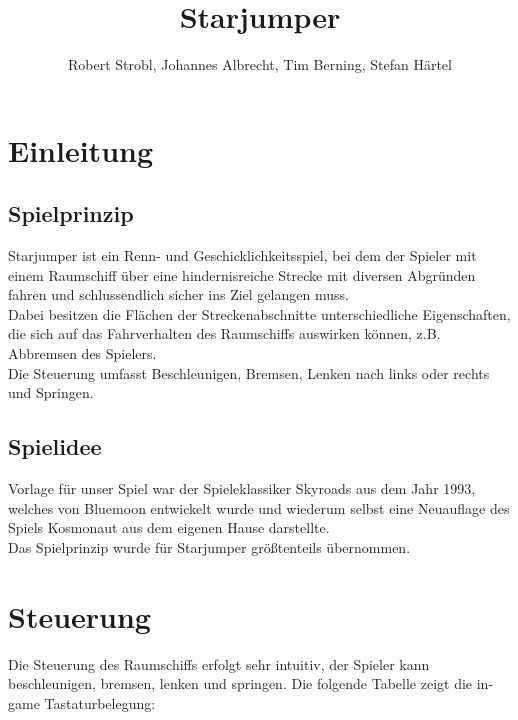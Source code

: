 \documentclass{llncs}
\begin{document}
\title{Starjumper}
\author{Robert Strobl, Johannes Albrecht, Tim Berning, Stefan H\"artel}

\maketitle

\section{Einleitung}

\subsection{Spielprinzip}
Starjumper ist ein Renn- und Geschicklichkeitsspiel, bei dem der Spieler mit einem
Raumschiff \"uber eine hindernisreiche Strecke mit diversen Abgr\"unden fahren und
schlussendlich sicher ins Ziel gelangen muss.\\
Dabei besitzen die Fl\"achen der Streckenabschnitte unterschiedliche Eigenschaften,
die sich auf das Fahrverhalten des Raumschiffs auswirken k\"onnen, z.B. Abbremsen
des Spielers.\\
Die Steuerung umfasst Beschleunigen, Bremsen, Lenken nach links oder rechts und
Springen.

\subsection{Spielidee}
Vorlage f\"ur unser Spiel war der Spieleklassiker Skyroads aus dem Jahr 1993, welches
von Bluemoon entwickelt wurde und wiederum selbst eine Neuauflage des Spiels Kosmonaut
aus dem eigenen Hause darstellte.\\
Das Spielprinzip wurde f\"ur Starjumper gr\"o\ss tenteils \"ubernommen.


\section{Steuerung}
Die Steuerung des Raumschiffs erfolgt sehr intuitiv, der Spieler kann beschleunigen,
bremsen, lenken und springen. Die folgende Tabelle zeigt die in-game Tastaturbelegung:
\end{document}
